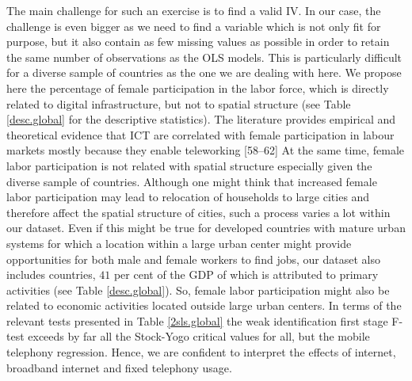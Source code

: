 \documentclass[10pt,letterpaper]{article}
\begin{document}
The main challenge for such an exercise is to find a valid IV. In our
case, the challenge is even bigger as we need to find a variable which
is not only fit for purpose, but it also contain as few missing values
as possible in order to retain the same number of observations as the
OLS models. This is particularly difficult for a diverse sample of
countries as the one we are dealing with here. We propose here the
percentage of female participation in the labor force, which is directly
related to digital infrastructure, but not to spatial structure (see
Table \ref{desc.global} for the descriptive statistics). The literature
provides empirical and theoretical evidence that ICT are correlated with
female participation in labour markets mostly because they enable
teleworking {[}58--62{]} \color{black} At the same time, female labor
participation is not related with spatial structure especially given the
diverse sample of countries. Although one might think that increased
female labor participation may lead to relocation of households to large
cities and therefore affect the spatial structure of cities, such a
process varies a lot within our dataset. Even if this might be true for
developed countries with mature urban systems for which a location
within a large urban center might provide opportunities for both male
and female workers to find jobs, our dataset also includes countries,
\(41\) per cent of the GDP of which is attributed to primary activities
(see Table \ref{desc.global}). So, female labor participation might also
be related to economic activities located outside large urban centers.
In terms of the relevant tests presented in Table \ref{2sls.global} the
weak identification first stage F-test exceeds by far all the Stock-Yogo
critical values for all, but the mobile telephony regression. Hence, we
are confident to interpret the effects of internet, broadband internet
and fixed telephony usage.
\end{document}

